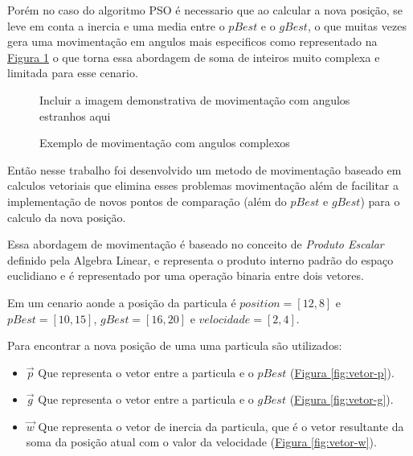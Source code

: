             Porém no caso do algoritmo PSO é necessario que ao calcular a nova posição, se leve em conta a inercia e uma media entre o $pBest$ e o $gBest$, o que muitas vezes gera uma movimentação em angulos mais especificos como representado na 
            \hyperref[fig:angular-moviment-grid-based]{Figura \ref{fig:angular-moviment-grid-based}}
            o que torna essa abordagem de soma de inteiros muito complexa e limitada para esse cenario.\newline
            
            \begin{figure}[h]
                \centering
                \small{Incluir a imagem demonstrativa de movimentação com angulos estranhos aqui}
                \caption{Exemplo de movimentação com angulos complexos}
                \label{fig:angular-moviment-grid-based}
            \end{figure}
            
            
            Então nesse trabalho foi desenvolvido um metodo de movimentação baseado em calculos vetoriais que elimina esses problemas movimentação além de facilitar a implementação de novos pontos de comparação (além do $pBest$ e $gBest$) para o calculo da nova posição.\newline
            
                Essa abordagem de movimentação é baseado no conceito de \textit{Produto Escalar} definido pela Algebra Linear, e representa o produto interno padrão do espaço euclidiano e é representado por uma operação binaria entre dois vetores.\newline
                
                \noindent Em um cenario aonde a posição da particula é $position=[12,8]$ e $pBest=[10, 15]$, $gBest=[16,20]$ e $velocidade=[2,4]$.

                \noindent Para encontrar a nova posição de uma uma particula são utilizados:
                \begin{itemize}
                    \item $\vec p$ Que representa o vetor entre a particula e o $pBest$ 
                        (\hyperref[fig:vetor-p]{Figura \ref{fig:vetor-p}}).
                    \item $\vec g$ Que representa o vetor entre a particula e o $gBest$ 
                        (\hyperref[fig:vetor-g]{Figura \ref{fig:vetor-g}}).
                    \item $\vec w$ Que representa o vetor de inercia da particula, que é o vetor resultante da soma da posição atual com o valor da velocidade 
                        (\hyperref[fig:vetor-w]{Figura \ref{fig:vetor-w}}).
                \end{itemize}

